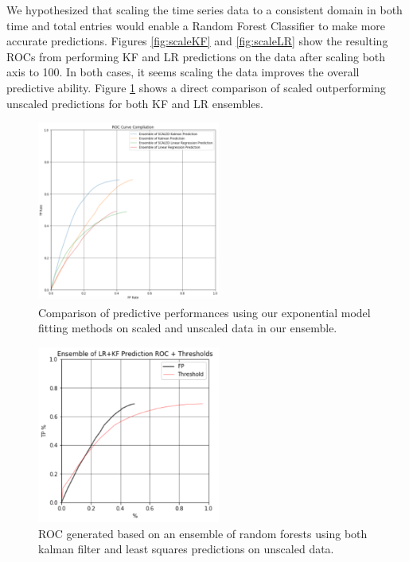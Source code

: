 We hypothesized that scaling the time series data to a consistent domain in both time and total entries would enable a Random Forest Classifier to make more accurate predictions. Figures \ref{fig:scaleKF} and \ref{fig:scaleLR} show the resulting ROCs from performing KF and LR predictions on the data after scaling both axis to 100. In both cases, it seems scaling the data improves the overall predictive ability. Figure \ref{fig:allFits} shows a direct comparison of scaled outperforming unscaled predictions for both KF and LR ensembles.

\begin{figure}[h]
\centering
\includegraphics[width=6cm]{body/results/allEnsLines.png}
\caption{Comparison of predictive performances using our exponential model fitting methods on scaled and unscaled data in our ensemble.}
\label{fig:allFits}
\end{figure}

\begin{figure}[h]
\centering
\includegraphics[width=6cm]{body/results/ensLR_KF.png}
\caption{ROC generated based on an ensemble of random forests using both kalman filter and least squares predictions on unscaled data.}
\label{fig:unBoth}
\end{figure}

